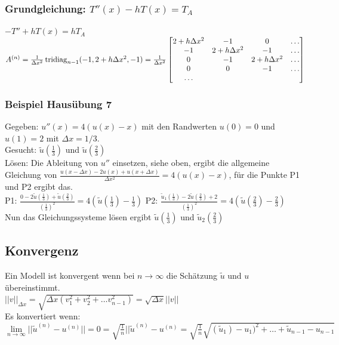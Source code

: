 \subsubsection{Grundgleichung: $T''(x) -  h T(x) = T_A$}
$-T'' + h T(x) = h T_A$\\
$A^{(n)}= \frac{1}{\Delta x^2} \operatorname{tridiag}_{n-1}
(-1,2+h\Delta x^2,-1) = \frac{1}{\Delta x^2}
  \begin{bmatrix}
             2+h\Delta x^2& -1 & 0 & \ldots \\
             -1& 2+h\Delta x^2 & -1 & \ldots \\
              0& -1 & 2+h\Delta x^2 & \ldots \\
              0& 0 & -1 & \ldots \\
             \ldots 
           \end{bmatrix} $\\    
              
\subsubsection{Beispiel Hausübung 7}
Gegeben: $ u''(x)=4(u(x)-x) $ mit den Randwerten $ u(0)=0 $  und $ u(1)=2 $ mit $\Delta x=1/3$.
\\
Gesucht: $ \tilde{u}(\frac{1}{3}) $ und $ \tilde{u}(\frac{2}{3}) $
\\
Lösen: Die Ableitung von $ u'' $ einsetzen, siehe oben, ergibt die allgemeine Gleichung von $ \frac{u(x-\Delta x)-2 u(x) + u(x+ \Delta x)}{\Delta x^2} =4 (u(x)-x) $, für die Punkte P1 und P2 ergibt das.
\\
P1: $ \frac{0-2 \tilde{u}(\frac{1}{3}) + \tilde{u}(\frac{2}{3})}{(\frac{1}{3})^2} =4(\tilde{u}(\frac{1}{3})-\frac{1}{3}) $
\qquad \qquad
P2: $ \frac{\tilde{u}_1(\frac{1}{3})-2 \tilde{u}(\frac{2}{3}) + 2}{(\frac{1}{3})^2} =4(\tilde{u}(\frac{2}{3})-\frac{2}{3}) $
\\
Nun das Gleichungssysteme lösen ergibt $ \tilde{u}(\frac{1}{3}) $ und $ \tilde{u}_2(\frac{2}{3}) $          
           
           
\subsection{Konvergenz}
Ein Modell ist konvergent wenn bei $n\rightarrow\infty$ die Schätzung $\tilde{u}$ und $u$ übereinstimmt.\\

$\boxed{||v||_{\Delta x}=\sqrt{\Delta x (v_1^2+v_2^2 + \ldots v_{n-1}^2)}= \sqrt{\Delta
x}||v||}$\\
Es konvertiert wenn: $\lim\limits_{n\to \infty
}||\tilde{u}^{(n)}-u^{(n)}||=0=\sqrt{\frac{1}{n}}||\tilde{u}^{(n)}-u^{(n)}=\sqrt{\frac{1}{n}}\sqrt{(\tilde{u}_1)-u_1)^2
+ \ldots + \tilde{u}_{n-1}-u_{n-1}}$\\

